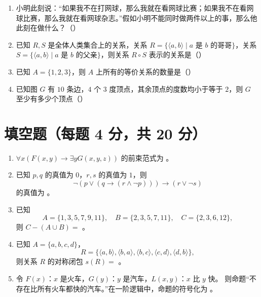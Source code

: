\begin{enumerate}
    \item 小明此刻说：“如果我不在打网球，那么我就在看网球比赛；如果我不在看网球比赛，那么我就在看网球杂志。”假如小明不能同时做两件以上的事，那么他此刻在做什么？（\quad）

    \item 已知 $R,S$ 是全体人类集合上的关系，关系 $R=\{\langle a,b\rangle\mid a\text{ 是 }b\text{ 的哥哥}\}$，关系 $S=\{\langle a,b\rangle\mid a\text{ 是 }b\text{ 的父亲}\}$，则关系 $R\circ S$ 表示的关系是（\quad）

    \item 已知 $A=\{1,2,3\}$，则 $A$ 上所有的等价关系的数量是（\quad）

    \item 已知图 $G$ 有 $10$ 条边，$4$ 个 $3$ 度顶点，其余顶点的度数均小于等于 $2$，则 $G$ 至少有多少个顶点（\quad）
\end{enumerate}

\section{填空题（每题 4 分，共 20 分）}

\begin{enumerate}
    \item $\forall x(F(x,y)\to \exists yG(x,y,z))$ 的前束范式为 \underline{\hspace{8cm}}。

    \item 已知 $p,q$ 的真值为 $0$，$r,s$ 的真值为 $1$，则
    \[
        \neg(p\lor(q\to(r\land \neg p)))\to(r\lor \neg s)
    \]
    的真值为 \underline{\hspace{4cm}}。

    \item 已知
    \[
        A=\{1,3,5,7,9,11\},\quad B=\{2,3,5,7,11\},\quad C=\{2,3,6,12\},
    \]
    则 $C-(A\cup B)=$ \underline{\hspace{5cm}}。

    \item 已知 $A=\{a,b,c,d\}$，
    \[
        R=\{\langle a,b\rangle,\langle b,a\rangle,\langle b,c\rangle,\langle c,d\rangle,\langle d,b\rangle\},
    \]
    则关系 $R$ 的对称闭包 $s(R)=$ \underline{\hspace{8cm}}。

    \item 令 $F(x)$：$x$ 是火车，$G(y)$：$y$ 是汽车，$L(x,y)$：$x$ 比 $y$ 快。
    则命题“不存在比所有火车都快的汽车。”在一阶逻辑中，命题的符号化为 \underline{\hspace{8cm}}。
\end{enumerate}

